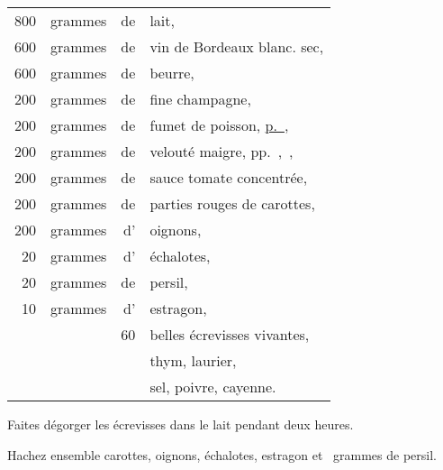 \footnotesize
\begin{longtable}{rrrp{16em}}
  800 & grammes    & de & lait,                                                                           \\
  600 & grammes    & de & vin de Bordeaux blanc. sec,                                                     \\
  600 & grammes    & de & beurre,                                                                         \\
  200 & grammes    & de & fine champagne,                                                                 \\
  200 & grammes    & de & fumet de poisson, \hyperlink{p0285}{p. \pageref{pg0285}},                       \\
  200 & grammes    & de & velouté maigre, pp. \hyperlink{p0292}{\pageref{pg0292}}, \hyperlink{p0388}{\pageref{pg0388}},  \\
  200 & grammes    & de & sauce tomate concentrée,                                                        \\
  200 & grammes    & de & parties rouges de carottes,                                                     \\
  200 & grammes    & d' & oignons,                                                                        \\
   20 & grammes    & d' & échalotes,                                                                      \\
   20 & grammes    & de & persil,                                                                         \\
   10 & grammes    & d' & estragon,                                                                       \\
      &            & 60 & belles écrevisses vivantes,                                                     \\
      &            &    & thym, laurier,                                                                  \\
      &            &    & sel, poivre, cayenne.                                                           \\
\end{longtable}
\normalsize

Faites dégorger les écrevisses dans le lait pendant deux heures.

Hachez ensemble carottes, oignons, échalotes, estragon et {\mmm} grammes de persil.

